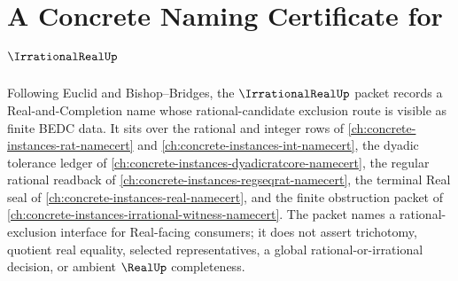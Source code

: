 \chapter{A Concrete Naming Certificate for $\IrrationalRealUp$}
\label{ch:concrete-instances-irrational-real-namecert}

Following Euclid and Bishop--Bridges, the $\IrrationalRealUp$ packet records a Real-and-Completion name whose rational-candidate exclusion route is visible as finite BEDC data. It sits over the rational and integer rows of \autoref{ch:concrete-instances-rat-namecert} and \autoref{ch:concrete-instances-int-namecert}, the dyadic tolerance ledger of \autoref{ch:concrete-instances-dyadicratcore-namecert}, the regular rational readback of \autoref{ch:concrete-instances-regseqrat-namecert}, the terminal Real seal of \autoref{ch:concrete-instances-real-namecert}, and the finite obstruction packet of \autoref{ch:concrete-instances-irrational-witness-namecert}. The packet names a rational-exclusion interface for Real-facing consumers; it does not assert trichotomy, quotient real equality, selected representatives, a global rational-or-irrational decision, or ambient $\RealUp$ completeness.

